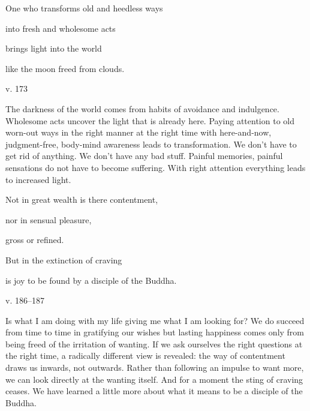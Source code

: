 \documentclass[a4paper,portrait,12pt]{article}
\begin{document}
One who transforms old and heedless ways


into fresh and wholesome acts


brings light into the world


like the moon freed from clouds.





v. 173 





The darkness of the world comes from habits of avoidance and indulgence. Wholesome acts uncover the light that is already here. Paying attention to old worn-out ways in the right manner at the right time with here-and-now, judgment-free, body-mind awareness leads to transformation. We don't have to get rid of anything. We don't have any bad stuff. Painful memories, painful sensations do not have to become suffering. With right attention everything leads to increased light.














Not in great wealth is there contentment,


nor in sensual pleasure,


gross or refined.


But in the extinction of craving


is joy to be found by a disciple of the Buddha.





v. 186--187 


 


Is what I am doing with my life giving me what I am looking for? We do succeed from time to time in gratifying our wishes but lasting happiness comes only from being freed of the irritation of wanting. If we ask ourselves the right questions at the right time, a radically different view is revealed: the way of contentment draws us inwards, not outwards. Rather than following an impulse to want more, we can look directly at the wanting itself. And for a moment the sting of craving ceases. We have learned a little more about what it means to be a disciple of the Buddha.
\end{document}
